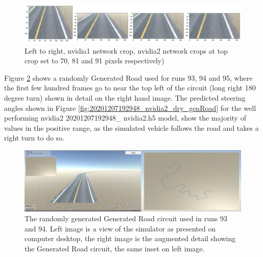 \begin{figure}[ht]
 \centering 
 \includegraphics[width=\textwidth]{Figures/nvidia1x1_nvidia2x3_crops.png}
 \caption{Left to right, nvidia1 network crop, nvidia2 network crops at top crop set to 70, 81 and 91 pixels respectively)}
 \label{fig:nvidia1x1_nvidia2x3_crops_results} %
\end{figure}



Figure \ref{fig:run-93-94-generated-road} shows a randomly Generated Road used for runs 93, 94 and 95, where the first few hundred frames go to near the top left of the circuit (long right 180 degree turn) shown in detail on the right hand image. The predicted steering angles shown in Figure  \ref{fig:20201207192948_nvidia2_dry_genRoad} for the well performing nvidia2 20201207192948\_ nvidia2.h5 model, show the majority of values in the positive range, as the simulated vehicle follows the road and takes a right turn to do so.

\begin{figure}[ht]
 \centering 
 \includegraphics[width=\textwidth]{Figures/run-93-94-generated-road.png}
 \caption{The randomly generated Generated Road circuit used in runs 93 and 94. Left image is a view of the simulator as presented on computer desktop, the right image is the augmented detail showing the Generated Road circuit, the same inset on left image.}
 \label{fig:run-93-94-generated-road} 
\end{figure}


